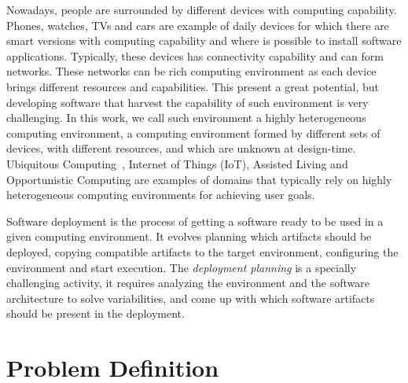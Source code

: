 
Nowadays, people are surrounded by different devices with computing capability. Phones, watches, TVs and cars are example of daily devices for which there are smart versions with computing capability and where is possible to install software applications. Typically, these devices has connectivity capability and can form networks. These networks can be rich computing environment as each device brings different resources and capabilities. This present a great potential, but developing software that harvest the capability of such environment is very challenging.
In this work, we call such environment a highly heterogeneous computing environment, a computing environment formed by different sets of devices, with different resources, and which are unknown at design-time. Ubiquitous Computing~\cite{bell_yesterdays_2007}, Internet of Things (IoT)\cite{atzori_internet_2010}, Assisted Living\cite{kleinberger_ambient_2007} and Opportunistic Computing\cite{smaldone_improving_2011} are examples of domains that typically rely on highly heterogeneous computing environments for achieving user goals.

Software deployment is the process of getting a software ready to be used in a given computing environment\cite{carzaniga_characterization_1998}. It evolves planning which artifacts should be deployed, copying compatible artifacts to the target environment, configuring the environment and start execution. The \emph{deployment planning} is a specially challenging activity, it requires analyzing the environment and the software architecture to solve variabilities, and come up with which software artifacts should be present in the deployment.


\section{Problem Definition}


